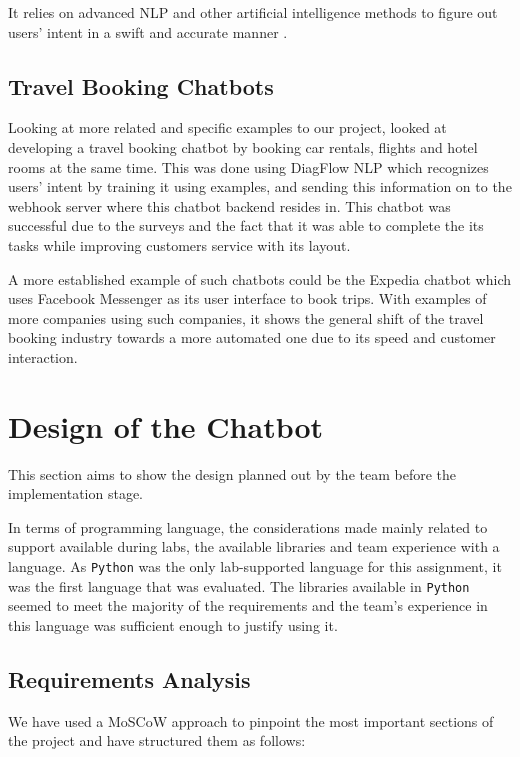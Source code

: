 \documentclass[11pt]{article}
\newcommand{\code}[1]{{\texttt{#1}}}
\begin{document}
    It relies on advanced NLP and other artificial intelligence methods to figure out users' intent in a swift and accurate manner \citep{sri2020nlp}.


    \subsection{Travel Booking Chatbots}
    Looking at more related and specific examples to our project, \citep{lino2018travel} looked at developing a travel booking chatbot by booking car rentals, flights and hotel rooms at the same time. This was done using DiagFlow NLP which recognizes users' intent by training it using examples, and sending this information on to the webhook server where this chatbot backend resides in. This chatbot was successful due to the surveys and the fact that it was able to complete the its tasks while improving customers service with its layout.

    A more established example of such chatbots could be the Expedia chatbot \citep{expediaBot} which uses Facebook Messenger as its user interface to book trips. With examples of more companies using such companies, it shows the general shift of the travel booking industry towards a more automated one due to its speed and customer interaction.


\section{Design of the Chatbot}\label{sec:DesignMain}
This section aims to show the design planned out by the team before the implementation stage.

In terms of programming language, the considerations made mainly related to support available during labs, the available libraries and team experience with a language. As \code{Python} was the only lab-supported language for this assignment, it was the first language that was evaluated. The libraries available in \code{Python} seemed to meet the majority of the requirements and the team’s experience in this language was sufficient enough to justify using it.

    \subsection{Requirements Analysis}
    We have used a MoSCoW approach to pinpoint the most important sections of the project and have structured them as follows:
\end{document}
